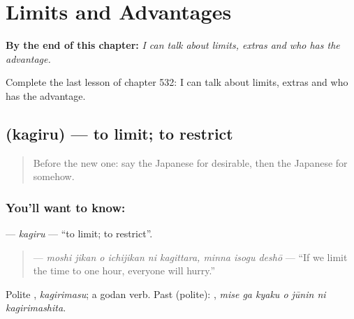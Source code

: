 
\chapter{Limits and Advantages}
\label{ch:ja-limits-and-advantages}

\begin{chapteropening}
\textbf{By the end of this chapter:} \emph{I can talk about limits, extras and who has the advantage.}

Complete the last lesson of chapter 532: I can talk about limits, extras and who has the advantage.
\end{chapteropening}

\section[\texorpdfstring{\ja{かぎる} (kagiru)}{かぎる (kagiru)}]{ (kagiru) — to limit; to restrict}

\label{lesson:JA-C532-kagiru}



\begin{quote}
Before the new one: say the Japanese for desirable, then the Japanese for somehow.
\end{quote}

\subsection*{You'll want to know: }
\textbf{} — \emph{kagiru} — \textquotedblleft{}to limit; to restrict\textquotedblright{}.

\begin{quote}
\textbf{    } — \emph{moshi jikan o ichijikan ni kagittara, minna isogu deshō} — \textquotedblleft{}If we limit the time to one hour, everyone will hurry.\textquotedblright{}
\end{quote}

Polite \textbf{}, \emph{kagirimasu}; a godan verb. Past (polite): \textbf{   }, \emph{mise ga kyaku o jūnin ni kagirimashita}.

